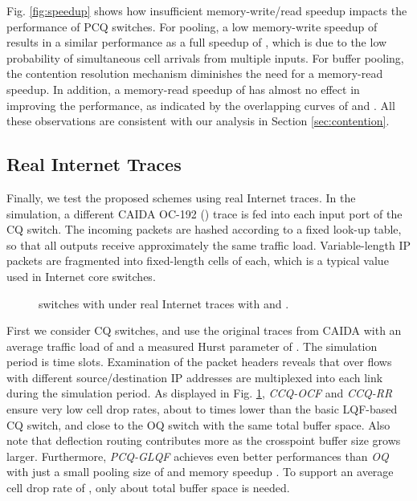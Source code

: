 \documentclass[journal,final,doublecolumn,10pt,twoside]{IEEEtranTCOM} \normalsize
\begin{document}
Fig. \ref{fig:speedup} shows how insufficient memory-write/read speedup impacts the performance of PCQ switches. For  pooling, a low memory-write speedup of  results in a similar performance as a full speedup of , which is due to the low probability of simultaneous cell arrivals from multiple inputs. For  buffer pooling, the contention resolution mechanism diminishes the need for a memory-read speedup. In addition, a memory-read speedup of  has almost no effect in improving the performance, as indicated by the overlapping curves of  and . All these observations are consistent with our analysis in Section \ref{sec:contention}.

\subsection{Real Internet Traces}

Finally, we test the proposed schemes using real Internet traces. In the simulation, a different CAIDA OC-192 () trace \cite{ipv6day} is fed into each input port of the CQ switch. The incoming packets are hashed according to a fixed look-up table, so that all outputs receive approximately the same traffic load. Variable-length IP packets are fragmented into fixed-length cells of  each, which is a typical value used in Internet core switches. 



\begin{figure}[ht]
\begin{minipage}[t]{3.2 in}
\centering {}
\end{minipage}
\begin{minipage}[t]{3.2 in}
\centering {}
\end{minipage}
\caption{ switches with  under real Internet traces with  and .}
\label{fig:caida}
\end{figure}

First we consider  CQ switches, and use the original traces from CAIDA with an average traffic load of  and a measured Hurst parameter of . The simulation period is  time slots. Examination of the packet headers reveals that over  flows with different source/destination IP addresses are multiplexed into each link during the simulation period. As displayed in Fig. \ref{fig:caida}, \emph{CCQ-OCF} and \emph{CCQ-RR} ensure very low cell drop rates, about  to  times lower than the basic LQF-based CQ switch, and close to the OQ switch with the same total buffer space. Also note that deflection routing contributes more as the crosspoint buffer size grows larger. Furthermore, \emph{PCQ-GLQF} achieves even better performances than \emph{OQ} with just a small pooling size of  and memory speedup . To support an average cell drop rate of , only about  total buffer space is needed.
\end{document}
